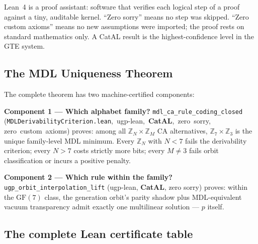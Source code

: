 \documentclass[11pt,a4paper]{article}
\newcommand{\lean}[1]{\texttt{#1}}
\newcommand{\CatAL}{\textbf{CatAL}}
\theoremstyle{definition}
\begin{document}
\begin{tcolorbox}[colback=boxgray,colframe=gray!50!black,
  title={What machine-certified means}]
Lean~4 is a proof assistant: software that verifies each logical step of a
proof against a tiny, auditable kernel.  ``Zero sorry'' means no step was
skipped.  ``Zero custom axioms'' means no new assumptions were imported;
the proof rests on standard mathematics only.  A CatAL result is the
highest-confidence level in the GTE system.
\end{tcolorbox}

\subsection{The MDL Uniqueness Theorem}

The complete theorem has two machine-certified components:

\medskip
\noindent
\textbf{Component 1 — Which alphabet family?}
\mbox{\lean{mdl\_ca\_rule\_coding\_closed}}\\
\mbox{(\texttt{MDLDerivabilityCriterion.lean}, ugp-lean, \CatAL, zero sorry,}
\mbox{zero custom axioms)} proves: among all $\mathbb{Z}_N \times \mathbb{Z}_M$ CA
alternatives, $\mathbb{Z}_7 \times \mathbb{Z}_3$ is the unique
family-level MDL minimum.  Every $\mathbb{Z}_N$ with $N < 7$ fails the
derivability criterion; every $N > 7$ costs strictly more bits; every
$M \neq 3$ fails orbit classification or incurs a positive penalty.

\medskip
\noindent
\textbf{Component 2 — Which rule within the family?}
\lean{ugp\_orbit\_interpolation\_lift}
(ugp-lean, \CatAL, zero sorry) proves: within the $\mathrm{GF}(7)$ class,
the generation orbit's parity shadow plus MDL-equivalent vacuum transparency
admit exactly one multilinear solution — $p$ itself.

\subsection{The complete Lean certificate table}
\end{document}
